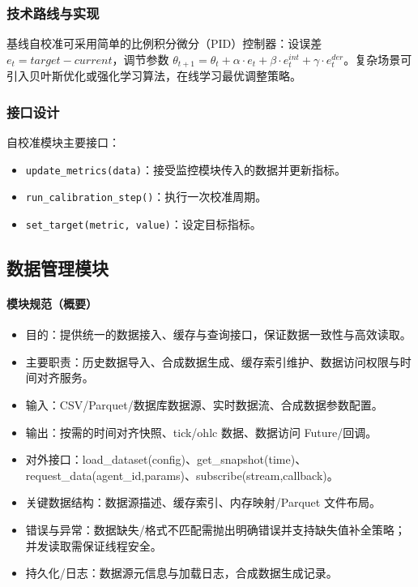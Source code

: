 \subsubsection{技术路线与实现}
基线自校准可采用简单的比例积分微分（PID）控制器：设误差$ e_t = target - current $，调节参数 $ \theta_{t+1} = \theta_t + \alpha\cdot e_t + \beta\cdot e_t^{int} + \gamma\cdot e_t^{der} $。复杂场景可引入贝叶斯优化或强化学习算法，在线学习最优调整策略。

\subsubsection{接口设计}
自校准模块主要接口：
\begin{itemize}
  \item \verb|update_metrics(data)|：接受监控模块传入的数据并更新指标。
  \item \verb|run_calibration_step()|：执行一次校准周期。
  \item \verb|set_target(metric, value)|：设定目标指标。
\end{itemize}

\subsection{数据管理模块}

\paragraph{模块规范（概要）}
\begin{itemize}
  \item 目的：提供统一的数据接入、缓存与查询接口，保证数据一致性与高效读取。
  \item 主要职责：历史数据导入、合成数据生成、缓存索引维护、数据访问权限与时间对齐服务。
  \item 输入：CSV/Parquet/数据库数据源、实时数据流、合成数据参数配置。
  \item 输出：按需的时间对齐快照、tick/ohlc 数据、数据访问 Future/回调。
  \item 对外接口：load\_dataset(config)、get\_snapshot(time)、request\_data(agent\_id,params)、subscribe(stream,callback)。
  \item 关键数据结构：数据源描述、缓存索引、内存映射/Parquet 文件布局。
  \item 错误与异常：数据缺失/格式不匹配需抛出明确错误并支持缺失值补全策略；并发读取需保证线程安全。
  \item 持久化/日志：数据源元信息与加载日志，合成数据生成记录。
\end{itemize}

